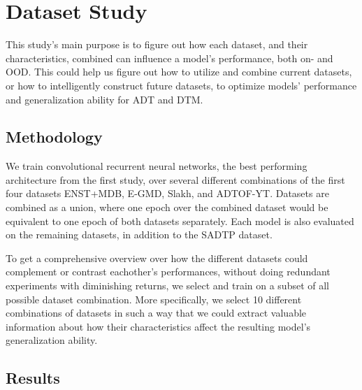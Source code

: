 \chapter{Dataset Study}\label{Study2}

This study's main purpose is to figure out how each dataset, and their characteristics, combined can influence a model's performance, both on- and \gls{OOD}. This could help us figure out how to utilize and combine current datasets, or how to intelligently construct future datasets, to optimize models' performance and generalization ability for \acrfull{ADT} and \acrfull{DTM}.

\section{Methodology}

We train convolutional recurrent neural networks, the best performing architecture from the first study, over several different combinations of the first four datasets ENST+MDB, E-GMD, Slakh, and ADTOF-YT. Datasets are combined as a union, where one epoch over the combined dataset would be equivalent to one epoch of both datasets separately. Each model is also evaluated on the remaining datasets, in addition to the SADTP dataset.

To get a comprehensive overview over how the different datasets could complement or contrast eachother's performances, without doing redundant experiments with diminishing returns, we select and train on a subset of all possible dataset combination. More specifically, we select 10 different combinations of datasets in such a way that we could extract valuable information about how their characteristics affect the resulting model's generalization ability.

\section{Results}


